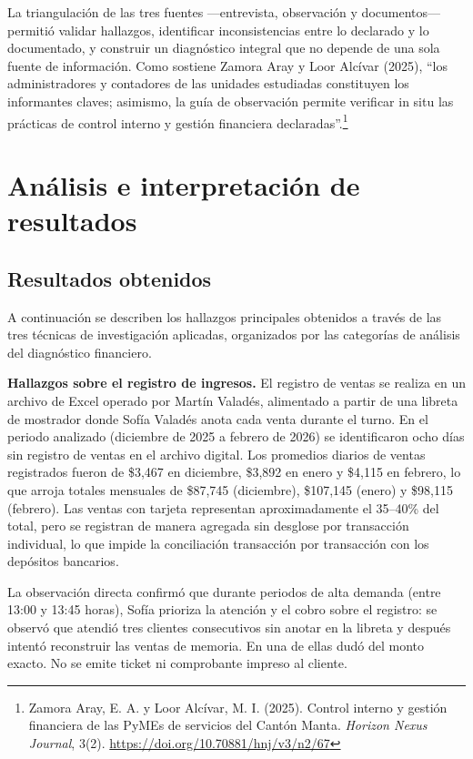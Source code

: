 \documentclass[12pt,letterpaper]{article}
\begin{document}
La triangulación de las tres fuentes ---entrevista, observación y documentos--- permitió validar hallazgos, identificar inconsistencias entre lo declarado y lo documentado, y construir un diagnóstico integral que no depende de una sola fuente de información. Como sostiene Zamora Aray y Loor Alcívar (2025), ``los administradores y contadores de las unidades estudiadas constituyen los informantes claves; asimismo, la guía de observación permite verificar in situ las prácticas de control interno y gestión financiera declaradas''.\footnote{Zamora Aray, E. A. y Loor Alcívar, M. I. (2025). Control interno y gestión financiera de las PyMEs de servicios del Cantón Manta. \textit{Horizon Nexus Journal}, 3(2). \url{https://doi.org/10.70881/hnj/v3/n2/67}}

\section{Análisis e interpretación de resultados}

\subsection{Resultados obtenidos}

A continuación se describen los hallazgos principales obtenidos a través de las tres técnicas de investigación aplicadas, organizados por las categorías de análisis del diagnóstico financiero.

\textbf{Hallazgos sobre el registro de ingresos.} El registro de ventas se realiza en un archivo de Excel operado por Martín Valadés, alimentado a partir de una libreta de mostrador donde Sofía Valadés anota cada venta durante el turno. En el periodo analizado (diciembre de 2025 a febrero de 2026) se identificaron ocho días sin registro de ventas en el archivo digital. Los promedios diarios de ventas registrados fueron de \$3,467 en diciembre, \$3,892 en enero y \$4,115 en febrero, lo que arroja totales mensuales de \$87,745 (diciembre), \$107,145 (enero) y \$98,115 (febrero). Las ventas con tarjeta representan aproximadamente el 35--40\% del total, pero se registran de manera agregada sin desglose por transacción individual, lo que impide la conciliación transacción por transacción con los depósitos bancarios.

La observación directa confirmó que durante periodos de alta demanda (entre 13:00 y 13:45 horas), Sofía prioriza la atención y el cobro sobre el registro: se observó que atendió tres clientes consecutivos sin anotar en la libreta y después intentó reconstruir las ventas de memoria. En una de ellas dudó del monto exacto. No se emite ticket ni comprobante impreso al cliente.
\end{document}
